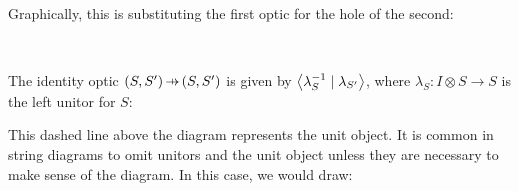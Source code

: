 \documentclass[11pt,letterpaper]{article}
\theoremstyle{plain}
\theoremstyle{definition}
\newcommand{\rep}[2]{{\ensuremath \left\langle #1 \mid #2 \right\rangle}}
\newcommand{\hto}{\ensuremath{\,\mathaccent\shortmid\rightarrow\,}}
\begin{document}
Graphically, this is substituting the first optic for the hole of the second:
\begin{center}
  
  \qquad\raisebox{1.5cm}{$\circ$}\qquad
   \\
  \raisebox{1.5cm}{$:=$}\qquad
  
\end{center}

The identity optic $(S, S') \hto (S, S')$ is given by $\rep{\lambda^{-1}_S}{\lambda_{S'}}$, where $\lambda_S : I \otimes S \to S$ is the left unitor for $S$:
\begin{center}
  
\end{center}
This dashed line above the diagram represents the unit object. It is common in string diagrams to omit unitors and the unit object unless they are necessary to make sense of the diagram. In this case, we would draw:
\begin{center}
  
\end{center}
\end{document}

